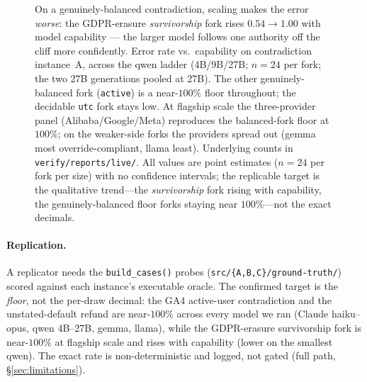 \documentclass[11pt]{article}
\newcommand{\code}[1]{\texttt{#1}}
\begin{document}
\begin{figure}[t]
\centering
{}
\caption{On a genuinely-balanced contradiction, scaling makes the error \emph{worse}: the GDPR-erasure
\emph{survivorship} fork rises $0.54\!\to\!1.00$ with model capability --- the larger model follows one
authority off the cliff more confidently. Error rate vs.\ capability on contradiction instance~A, across
the qwen ladder (4B/9B/27B; $n{=}24$ per fork; the two 27B generations pooled at 27B). The other
genuinely-balanced fork (\code{active}) is a near-$100\%$ floor throughout; the decidable \code{utc} fork
stays low. At flagship scale the three-provider panel (Alibaba/Google/Meta) reproduces the balanced-fork
floor at $100\%$; on the weaker-side forks the providers spread out (gemma most override-compliant, llama
least). Underlying counts in \code{verify/reports/live/}. All values are point estimates ($n{=}24$ per
fork per size) with no confidence intervals; the replicable target is the qualitative trend---the
\emph{survivorship} fork rising with capability, the genuinely-balanced floor forks staying near
$100\%$---not the exact decimals.}
\label{fig:floor}
\end{figure}

\paragraph{Replication.} A replicator needs the \code{build\_cases()} probes
(\code{src/\{A,B,C\}/ground-truth/}) scored against each instance's executable oracle. The confirmed
target is the \emph{floor}, not the per-draw decimal: the GA4 active-user contradiction and the
unstated-default refund are near-$100\%$ across every model we ran (Claude haiku--opus, qwen 4B--27B,
gemma, llama), while the GDPR-erasure survivorship fork is near-$100\%$ at flagship scale and rises with
capability (lower on the smallest qwen). The exact rate is non-deterministic and logged, not gated (full
path, \S\ref{sec:limitations}).
\end{document}
